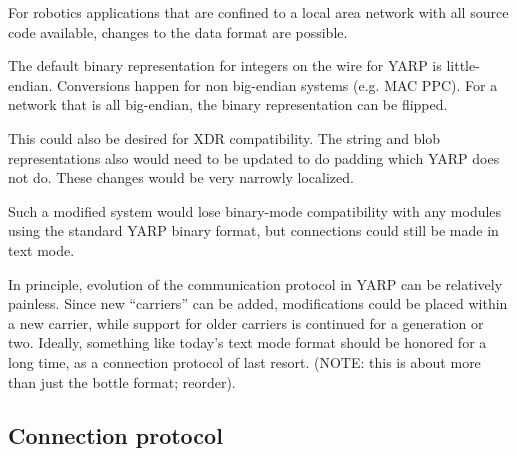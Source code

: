 






For robotics applications that are confined to a 
local area network with all source code available,
changes to the data format are possible.

The default binary representation for integers on
the wire for YARP is little-endian.  Conversions
happen for non big-endian systems (e.g. MAC PPC).
For a network that is all big-endian,  the 
binary representation can be flipped. 

This could also be desired for XDR compatibility.
The string and blob representations also would
need to be updated to do padding which YARP does
not do.  These changes would be very narrowly
localized.

Such a modified system would lose binary-mode compatibility with any
modules using the standard YARP binary format, but connections could
still be made in text mode.

In principle, evolution of the communication protocol in YARP can be
relatively painless.  Since new ``carriers'' can be added,
modifications could be placed within a new carrier, while support for
older carriers is continued for a generation or two.  Ideally,
something like today's text mode format should be honored for a long
time, as a connection protocol of last resort.
(NOTE: this is about more than just the bottle format; reorder).


\subsection{Connection protocol}

